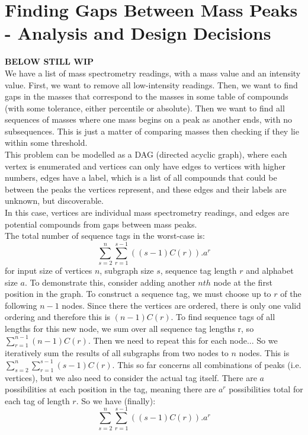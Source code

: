 \documentclass{article}
\begin{document}
\section*{Finding Gaps Between Mass Peaks - Analysis and Design Decisions}

\textbf{BELOW STILL WIP} \\

We have a list of mass spectrometry readings, with a mass value and an intensity value.
First, we want to remove all low-intensity readings.
Then, we want to find gaps in the masses that correspond to the masses in some table of compounds (with some tolerance, either percentile or absolute).
Then we want to find all sequences of masses where one mass begins on a peak as another ends, with no subsequences. 
This is just a matter of comparing masses then checking if they lie within some threshold. \\

This problem can be modelled as a DAG (directed acyclic graph), where each vertex is enumerated and vertices can only have edges to vertices with higher numbers,
edges have a label, which is a list of all compounds that could be between the peaks the vertices represent, and these edges and their labels are unknown,
but discoverable. \\

In this case, vertices are individual mass spectrometry readings, and edges are potential compounds from gaps between mass peaks. \\

The total number of sequence tags in the worst-case is:
\[\sum_{s=2}^{n}{\sum_{r=1}^{s-1}{((s-1)C(r)) . a^r}}\]
for input size of vertices \(n\), subgraph size \(s\), sequence tag length \(r\) and alphabet size \(a\). 
To demonstrate this, consider adding another \(nth\) node at the first position in the graph.
To construct a sequence tag, we must choose up to \(r\) of the following \(n-1\) nodes.
Since there the vertices are ordered, there is only one valid ordering and therefore this is \((n-1)C(r)\).
To find sequence tags of all lengths for this new node, we sum over all sequence tag lengths r, so \(\sum_{r=1}^{n-1}{(n-1)C(r)}\).
Then we need to repeat this for each node... So we iteratively sum the results of all subgraphs from two nodes to \(n\) nodes.
This is \(\sum_{s=2}^{n}{\sum_{r=1}^{s-1}{(s-1)C(r)}}\).
This so far concerns all combinations of peaks (i.e. vertices), but we also need to consider the actual tag itself.
There are \(a\) possibilities at each position in the tag, meaning there are \(a^r\) possibilities total for each tag of length \(r\).
So we have (finally):
\[\sum_{s=2}^{n}{\sum_{r=1}^{s-1}{((s-1)C(r)) . a^r}}\]
\end{document}
